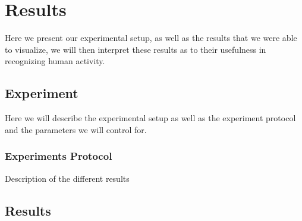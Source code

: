 \chapter{Results}
Here we present our experimental setup, as well as the results that we were able to visualize, we will then interpret these results as to their usefulness in recognizing human activity.

\section{Experiment}
Here we will describe the experimental setup as well as the experiment protocol and the parameters we will control for.

\subsection{Experiments Protocol}
Description of the different results

\section{Results}

